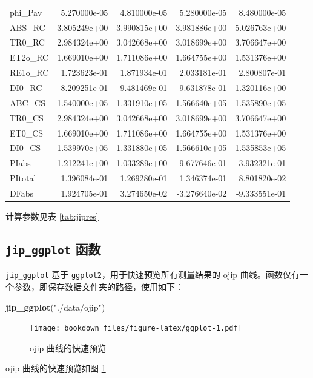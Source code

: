 \documentclass[]{krantz}
\makeatletter
\newenvironment{Shaded}{\begin{snugshade}}{\end{snugshade}}
\newcommand{\KeywordTok}[1]{\textcolor[rgb]{0.13,0.29,0.53}{\textbf{#1}}}
\newcommand{\StringTok}[1]{\textcolor[rgb]{0.31,0.60,0.02}{#1}}
\newcommand{\NormalTok}[1]{#1}
\newenvironment{kframe}{%
\medskip{}
\setlength{\fboxsep}{.8em}
 \def\at@end@of@kframe{}%
 \ifinner\ifhmode%
  \def\at@end@of@kframe{\end{minipage}}%
  \begin{minipage}{\columnwidth}%
 \fi\fi%
 \def\FrameCommand##1{\hskip\@totalleftmargin \hskip-\fboxsep
 \colorbox{shadecolor}{##1}\hskip-\fboxsep
     \hskip-\linewidth \hskip-\@totalleftmargin \hskip\columnwidth}%
 \MakeFramed {\advance\hsize-\width
   \@totalleftmargin\z@ \linewidth\hsize
   \@setminipage}}%
 {\par\unskip\endMakeFramed%
 \at@end@of@kframe}
\renewenvironment{Shaded}{\begin{kframe}}{\end{kframe}}
\theoremstyle{definition}
\theoremstyle{definition}
\theoremstyle{definition}
\theoremstyle{remark}
\makeatother
\begin{document}
\begin{longtable}{lrrrr}
phi\_Pav & 5.270000e-05 & 4.810000e-05 & 5.280000e-05 & 8.480000e-05\\
ABS\_RC & 3.805249e+00 & 3.990815e+00 & 3.981886e+00 & 5.026763e+00\\
TR0\_RC & 2.984324e+00 & 3.042668e+00 & 3.018699e+00 & 3.706647e+00\\
ET2o\_RC & 1.669010e+00 & 1.711086e+00 & 1.664755e+00 & 1.531376e+00\\
\addlinespace
RE1o\_RC & 1.723623e-01 & 1.871934e-01 & 2.033181e-01 & 2.800807e-01\\
DI0\_RC & 8.209251e-01 & 9.481469e-01 & 9.631878e-01 & 1.320116e+00\\
ABC\_CS & 1.540000e+05 & 1.331910e+05 & 1.566640e+05 & 1.535890e+05\\
TR0\_CS & 2.984324e+00 & 3.042668e+00 & 3.018699e+00 & 3.706647e+00\\
ET0\_CS & 1.669010e+00 & 1.711086e+00 & 1.664755e+00 & 1.531376e+00\\
\addlinespace
DI0\_CS & 1.539970e+05 & 1.331880e+05 & 1.566610e+05 & 1.535853e+05\\
PIabs & 1.212241e+00 & 1.033289e+00 & 9.677646e-01 & 3.932321e-01\\
PItotal & 1.396084e-01 & 1.269280e-01 & 1.346374e-01 & 8.801820e-02\\
DFabs & 1.924705e-01 & 3.274650e-02 & -3.276640e-02 & -9.333551e-01\\
\bottomrule
\end{longtable}

计算参数见表 \ref{tab:jipres}

\subsection{\texorpdfstring{\texttt{jip\_ggplot}
函数}{jip\_ggplot 函数}}\label{jip_ggplot-}

\texttt{jip\_ggplot} 基于 \texttt{ggplot2}，用于快速预览所有测量结果的
ojip 曲线。函数仅有一个参数，即保存数据文件夹的路径，使用如下：

\begin{Shaded}
\begin{Highlighting}[]
\KeywordTok{jip_ggplot}\NormalTok{(}\StringTok{"./data/ojip"}\NormalTok{)}
\end{Highlighting}
\end{Shaded}

\begin{figure}
\centering
\texttt{[image: bookdown\_files/figure-latex/ggplot-1.pdf]}
\caption{\label{fig:ggplot}ojip 曲线的快速预览}
\end{figure}

ojip 曲线的快速预览如图 \ref{fig:ggplot}

\cleardoublepage



\backmatter
\printindex
\end{document}
